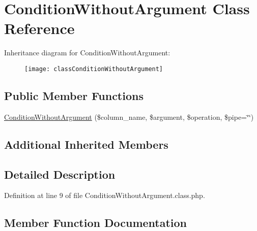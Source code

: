 \hypertarget{classConditionWithoutArgument}{}\section{Condition\+Without\+Argument Class Reference}
\label{classConditionWithoutArgument}
Inheritance diagram for Condition\+Without\+Argument\+:\begin{figure}[H]
\begin{center}
\leavevmode
\texttt{[image: classConditionWithoutArgument]}
\end{center}
\end{figure}
\subsection*{Public Member Functions}
\begin{DoxyCompactItemize}
\item 
\hyperlink{classConditionWithoutArgument_a42d42e70c74111b4980e2916b64c95e7}{Condition\+Without\+Argument} (\$column\+\_\+name, \$argument, \$operation, \$pipe=\char`\"{}\char`\"{})
\end{DoxyCompactItemize}
\subsection*{Additional Inherited Members}


\subsection{Detailed Description}


Definition at line 9 of file Condition\+Without\+Argument.\+class.\+php.



\subsection{Member Function Documentation}

